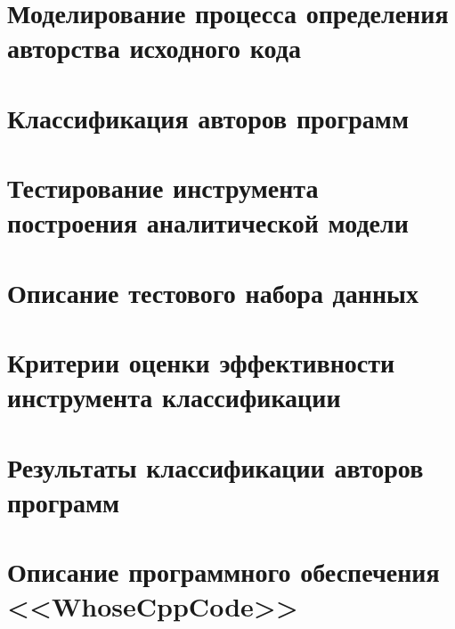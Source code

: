 \clearpage 
\section{Моделирование процесса определения авторства исходного кода}\label{modeling}

 
 
\clearpage 
\section{Классификация авторов программ}\label{classifiers}


\clearpage
\section{Тестирование инструмента построения аналитической модели}\label{crossval}


\clearpage
\section{Описание тестового набора данных}\label{test_data}

\clearpage
\section{Критерии оценки эффективности инструмента классификации}\label{eval}

\clearpage
\section{Результаты классификации авторов программ}


\clearpage
\section{Описание программного обеспечения <<WhoseCppCode>>}


% 

 \clearpage
 
 
 \clearpage
 

